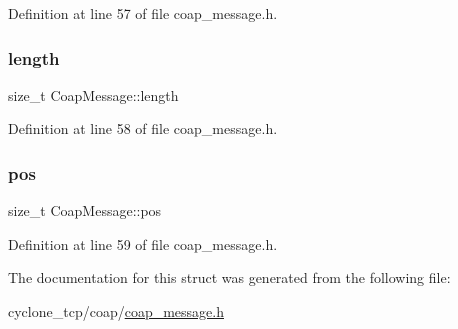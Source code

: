 Definition at line 57 of file coap\+\_\+message.\+h.

\mbox{\label{structCoapMessage_a0b85357992e3b1941c8621058369b842}} 
\subsubsection{\texorpdfstring{length}{length}}
{\footnotesize\ttfamily size\+\_\+t Coap\+Message\+::length}



Definition at line 58 of file coap\+\_\+message.\+h.

\mbox{\label{structCoapMessage_a8b472e6e9abab26da8f884f0eb3ce015}} 
\subsubsection{\texorpdfstring{pos}{pos}}
{\footnotesize\ttfamily size\+\_\+t Coap\+Message\+::pos}



Definition at line 59 of file coap\+\_\+message.\+h.



The documentation for this struct was generated from the following file\+:\begin{DoxyCompactItemize}
\item 
cyclone\+\_\+tcp/coap/\hyperlink{coap__message_8h}{coap\+\_\+message.\+h}\end{DoxyCompactItemize}
